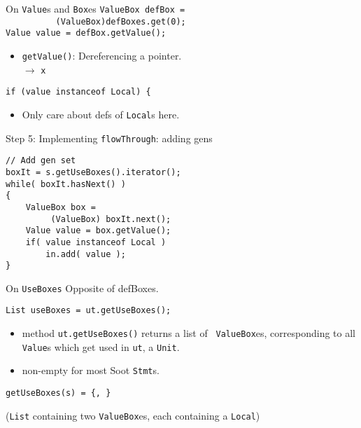 \begin{slide}{On {\tt Value}s and {\tt Box}es}
\verb+ValueBox defBox = +\\
\verb+          (ValueBox)defBoxes.get(0);+\\
{\red \verb+Value value = defBox.getValue();+}

\begin{itemize}
\item {\tt getValue()}: Dereferencing a pointer.\\
\qquad \qquad \qquad \qquad {} $\rightarrow$ {\tt x}
\end{itemize}

\verb+if (value instanceof Local) {+

\begin{itemize}
\item Only care about defs of {\tt Local}s here.
\end{itemize}
\end{slide}

\begin{slide}{Step 5: Implementing {\tt flowThrough}: adding gens}
\begin{verbatim}
// Add gen set
boxIt = s.getUseBoxes().iterator();
while( boxIt.hasNext() ) 
{
    ValueBox box = 
         (ValueBox) boxIt.next();
    Value value = box.getValue();
    if( value instanceof Local )
        in.add( value );
}
\end{verbatim}
\end{slide}

\begin{slide}{On {\tt UseBoxes}}
\vspace*{-0.1in}
Opposite of defBoxes.

{\tt List useBoxes = ut.getUseBoxes();}

\vspace*{-0.05in}
\begin{itemize}
\item method {\red \tt ut.getUseBoxes()} returns a list of {\tt
ValueBox}es, corresponding to all {\tt Value}s which get used
in {\tt ut}, a {\tt Unit}. 

\item non-empty for most Soot {\tt Stmt}s.
\end{itemize}

\vspace*{-0.08in}
\begin{center}
\end{center}

\vspace*{0.05in}
{\tt getUseBoxes(s) = \{, \}}\\
\qquad \qquad \begin{minipage}{0.8\textwidth} 
({\tt List} containing two {\tt ValueBox}es, each containing a {\tt Local})
\end{minipage}

\end{slide}

